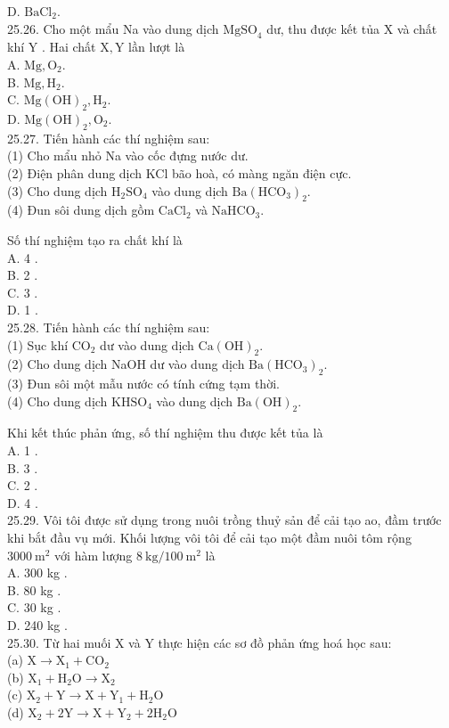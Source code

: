 \documentclass[10pt]{article}
\begin{document}
D. $\mathrm{BaCl}_{2}$.\\
25.26. Cho một mẩu Na vào dung dịch $\mathrm{MgSO}_{4}$ dư, thu được kết tủa X và chất khí Y . Hai chất $\mathrm{X}, \mathrm{Y}$ lần lượt là\\
A. $\mathrm{Mg}, \mathrm{O}_{2}$.\\
B. $\mathrm{Mg}, \mathrm{H}_{2}$.\\
C. $\mathrm{Mg}(\mathrm{OH})_{2}, \mathrm{H}_{2}$.\\
D. $\mathrm{Mg}(\mathrm{OH})_{2}, \mathrm{O}_{2}$.\\
25.27. Tiến hành các thí nghiệm sau:\\
(1) Cho mẩu nhỏ Na vào cốc đựng nước dư.\\
(2) Điện phân dung dịch KCl bão hoà, có màng ngăn điện cực.\\
(3) Cho dung dịch $\mathrm{H}_{2} \mathrm{SO}_{4}$ vào dung dịch $\mathrm{Ba}\left(\mathrm{HCO}_{3}\right)_{2}$.\\
(4) Đun sôi dung dịch gồm $\mathrm{CaCl}_{2}$ và $\mathrm{NaHCO}_{3}$.

Số thí nghiệm tạo ra chất khí là\\
A. 4 .\\
B. 2 .\\
C. 3 .\\
D. 1 .\\
25.28. Tiến hành các thí nghiệm sau:\\
(1) Sục khí $\mathrm{CO}_{2}$ dư vào dung dịch $\mathrm{Ca}(\mathrm{OH})_{2}$.\\
(2) Cho dung dịch NaOH dư vào dung dịch $\mathrm{Ba}\left(\mathrm{HCO}_{3}\right)_{2}$.\\
(3) Đun sôi một mẫu nước có tính cứng tạm thời.\\
(4) Cho dung dịch $\mathrm{KHSO}_{4}$ vào dung dịch $\mathrm{Ba}(\mathrm{OH})_{2}$.

Khi kết thúc phản ứng, số thí nghiệm thu được kết tủa là\\
A. 1 .\\
B. 3 .\\
C. 2 .\\
D. 4 .\\
25.29. Vôi tôi được sử dụng trong nuôi trồng thuỷ sản để cải tạo ao, đầm trước khi bắt đầu vụ mới. Khối lượng vôi tôi để cải tạo một đầm nuôi tôm rộng $3000 \mathrm{~m}^{2}$ với hàm lượng $8 \mathrm{~kg} / 100 \mathrm{~m}^{2}$ là\\
A. 300 kg .\\
B. 80 kg .\\
C. 30 kg .\\
D. 240 kg .\\
25.30. Từ hai muối X và Y thực hiện các sơ đồ phản ứng hoá học sau:\\
(a) $\mathrm{X} \longrightarrow \mathrm{X}_{1}+\mathrm{CO}_{2}$\\
(b) $\mathrm{X}_{1}+\mathrm{H}_{2} \mathrm{O} \longrightarrow \mathrm{X}_{2}$\\
(c) $\mathrm{X}_{2}+\mathrm{Y} \longrightarrow \mathrm{X}+\mathrm{Y}_{1}+\mathrm{H}_{2} \mathrm{O}$\\
(d) $\mathrm{X}_{2}+2 \mathrm{Y} \longrightarrow \mathrm{X}+\mathrm{Y}_{2}+2 \mathrm{H}_{2} \mathrm{O}$
\end{document}

